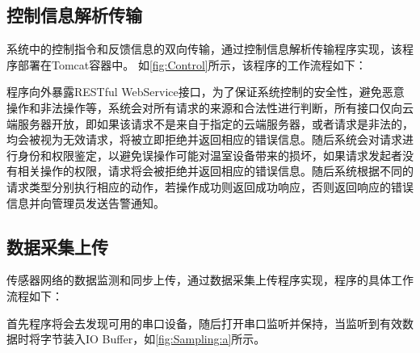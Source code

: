 	\subsection{控制信息解析传输}
	系统中的控制指令和反馈信息的双向传输，通过控制信息解析传输程序实现，该程序部署在Tomcat容器中。
如\ref{fig:Control}所示，该程序的工作流程如下：
\begin{figure}[!htp]
    \centering
    \resizebox{6cm}{!}{}
\end{figure}
程序向外暴露RESTful WebService接口，为了保证系统控制的安全性，避免恶意操作和非法操作等，系统会对所有请求的来源和合法性进行判断，所有接口仅向云端服务器开放，即如果该请求不是来自于指定的云端服务器，或者请求是非法的，均会被视为无效请求，将被立即拒绝并返回相应的错误信息。随后系统会对请求进行身份和权限鉴定，以避免误操作可能对温室设备带来的损坏，如果请求发起者没有相关操作的权限，请求将会被拒绝并返回相应的错误信息。随后系统根据不同的请求类型分别执行相应的动作，若操作成功则返回成功响应，否则返回响应的错误信息并向管理员发送告警通知。

	\subsection{数据采集上传}
	传感器网络的数据监测和同步上传，通过数据采集上传程序实现，程序的具体工作流程如下：
\begin{figure}[!htp]
    \subfigure[这是第一幅图]{
		\label{fig:Sampling:a} %
		\resizebox{6cm}{!}{}
	}
    \subfigure[这是第一幅图]{
		\label{fig:Sampling:b} %
		\resizebox{6cm}{!}{}
	}
\end{figure}
首先程序将会去发现可用的串口设备，随后打开串口监听并保持，当监听到有效数据时将字节装入IO Buffer，如\ref{fig:Sampling:a}所示。

